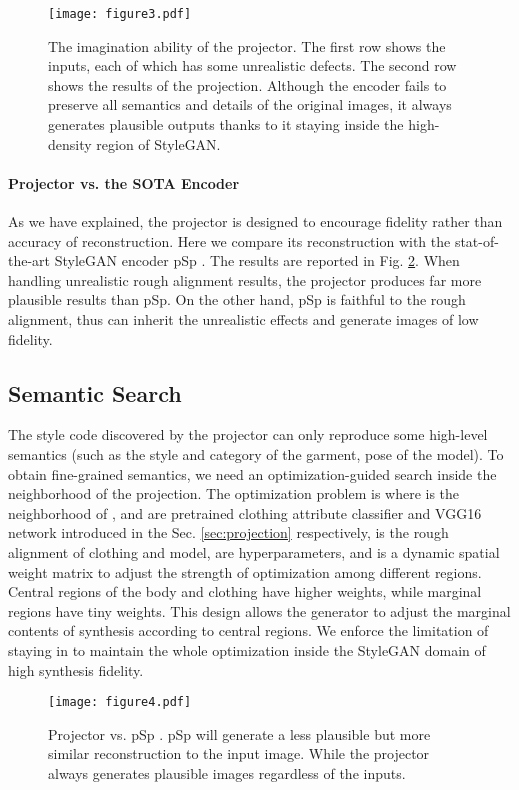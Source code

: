 \documentclass[10pt,twocolumn,letterpaper]{article}
\begin{document}
\begin{figure}[t]
  \centering
  \texttt{[image: figure3.pdf]}\caption{The imagination ability of the projector. The first row shows the inputs, each of which has some unrealistic defects. The second row shows the results of the projection. Although the encoder fails to preserve all semantics and details of the original images, it always generates plausible outputs thanks to it staying inside the high-density region of StyleGAN. }\label{fig: encoder-imagination}\end{figure}



\paragraph{Projector vs. the SOTA Encoder} As we have explained, the projector is designed to encourage fidelity rather than accuracy of reconstruction. Here we compare its reconstruction with the stat-of-the-art StyleGAN encoder pSp \cite{richardson2021encoding}. The results are reported in Fig. \ref{fig: figure_encoder_structure}. When handling unrealistic rough alignment results, the projector produces far more plausible results than pSp. On the other hand, pSp is faithful to the rough alignment, thus can inherit the unrealistic effects and generate images of low fidelity.


\subsection{Semantic Search}
The style code  discovered by the projector can only reproduce some high-level semantics (such as the style and category of the garment, pose of the model). To obtain fine-grained semantics, we need an optimization-guided search inside the neighborhood of the projection. The optimization problem is 
where  is the neighborhood of ,  and  are pretrained clothing attribute classifier and VGG16 network introduced in the Sec. \ref{sec:projection} respectively,  is the rough alignment of clothing and model,  are hyperparameters, and  is a dynamic spatial weight matrix to adjust the strength of optimization among different regions. Central regions of the body and clothing have higher weights, while marginal regions have tiny weights. This design allows the generator to adjust the marginal contents of synthesis according to central regions. We enforce the limitation of  staying in  to maintain the whole optimization inside the StyleGAN domain of high synthesis fidelity.
\begin{figure}[t]
  \centering
  \texttt{[image: figure4.pdf]}\caption{Projector vs. pSp \cite{richardson2021encoding}. pSp will generate a less plausible but more similar reconstruction to the input image. While the projector always generates plausible images regardless of the inputs.}\label{fig: figure_encoder_structure}\end{figure}
\end{document}
